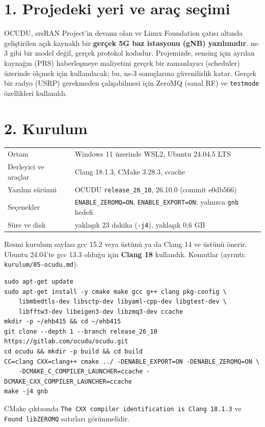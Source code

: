 \documentclass[10.5pt,a4paper]{article}
\begin{document}

\section*{1. Projedeki yeri ve araç seçimi}
OCUDU, srsRAN Project'in devamı olan ve Linux Foundation çatısı altında geliştirilen açık kaynaklı bir \textbf{gerçek 5G baz istasyonu (gNB) yazılımıdır}. ns-3 gibi bir model değil, gerçek protokol kodudur. Projemizde, sensing için ayrılan kaynağın (PRS) haberleşmeye maliyetini gerçek bir zamanlayıcı (scheduler) üzerinde ölçmek için kullanılacak; bu, ns-3 sonuçlarına güvenilirlik katar. Gerçek bir radyo (USRP) gerekmeden çalışabilmesi için ZeroMQ (sanal RF) ve \texttt{testmode} özellikleri kullanıldı.

\section*{2. Kurulum}
\begin{center}\sffamily\small
\begin{tabular}{@{}ll@{}}
\toprule
Ortam & Windows 11 üzerinde WSL2, Ubuntu 24.04.5 LTS \\
Derleyici ve araçlar & Clang 18.1.3, CMake 3.28.3, ccache \\
Yazılım sürümü & OCUDU \texttt{release\_26\_10}, 26.10.0 (commit e0db566) \\
Seçenekler & \texttt{ENABLE\_ZEROMQ=ON}, \texttt{ENABLE\_EXPORT=ON}; yalnızca \texttt{gnb} hedefi \\
Süre ve disk & yaklaşık 23 dakika (\texttt{-j4}), yaklaşık 0,6 GB \\
\bottomrule
\end{tabular}
\end{center}
Resmi kurulum sayfası gcc 15.2 veya üstünü ya da Clang 14 ve üstünü önerir. Ubuntu 24.04'te gcc 13.3 olduğu için \textbf{Clang 18} kullandık. Komutlar (ayrıntı: \texttt{kurulum/05-ocudu.md}):
\begin{lstlisting}
sudo apt-get update
sudo apt-get install -y cmake make gcc g++ clang pkg-config \
    libmbedtls-dev libsctp-dev libyaml-cpp-dev libgtest-dev \
    libfftw3-dev libeigen3-dev libzmq3-dev ccache
mkdir -p ~/ehb415 && cd ~/ehb415
git clone --depth 1 --branch release_26_10 https://gitlab.com/ocudu/ocudu.git
cd ocudu && mkdir -p build && cd build
CC=clang CXX=clang++ cmake ../ -DENABLE_EXPORT=ON -DENABLE_ZEROMQ=ON \
    -DCMAKE_C_COMPILER_LAUNCHER=ccache -DCMAKE_CXX_COMPILER_LAUNCHER=ccache
make -j4 gnb
\end{lstlisting}
CMake çıktısında \texttt{The CXX compiler identification is Clang 18.1.3} ve \texttt{Found libZEROMQ} satırları görünmelidir.
\end{document}
